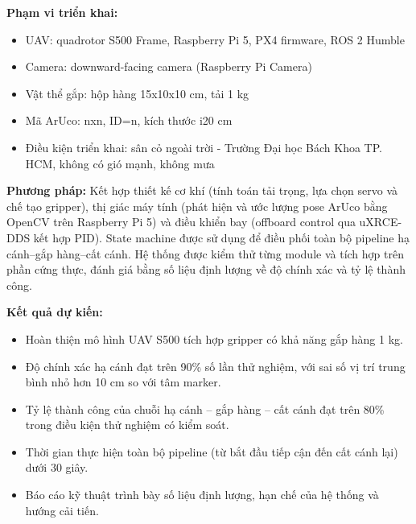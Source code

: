 \begin{mdframed}[style=decuongfield]
\vspace{1mm}
\textbf{Phạm vi triển khai:} 
\begin{itemize}
  \item UAV: quadrotor S500 Frame, Raspberry Pi 5, PX4 firmware, ROS 2 Humble
  \item Camera: downward-facing camera (Raspberry Pi Camera)
  \item Vật thể gắp: hộp hàng 15x10x10 cm, tải 1 kg
  \item Mã ArUco: nxn, ID=n, kích thước i20 cm
  \item Điều kiện triển khai: sân cỏ ngoài trời - Trường Đại học Bách Khoa TP. HCM, không có gió mạnh, không mưa
\end{itemize}
\par\vspace{-2mm}
\noindent\makebox[\linewidth][l]{\hspace*{-2.5mm}\rule{\dimexpr\linewidth+5mm\relax}{0.4pt}}\par


\vspace{1mm}
\textbf{Phương pháp:} 
Kết hợp thiết kế cơ khí (tính toán tải trọng, lựa chọn servo và chế tạo gripper), thị giác máy tính (phát hiện và ước lượng pose ArUco bằng OpenCV trên Raspberry Pi 5) và điều khiển bay (offboard control qua uXRCE-DDS kết hợp PID). State machine được sử dụng để điều phối toàn bộ pipeline hạ cánh–gắp hàng–cất cánh. Hệ thống được kiểm thử từng module và tích hợp trên phần cứng thực, đánh giá bằng số liệu định lượng về độ chính xác và tỷ lệ thành công.
\par\vspace{-2mm}
\noindent\makebox[\linewidth][l]{\hspace*{-2.5mm}\rule{\dimexpr\linewidth+5mm\relax}{0.4pt}}\par


\vspace{1mm}
\textbf{Kết quả dự kiến:} 
\begin{itemize}
\item Hoàn thiện mô hình UAV S500 tích hợp gripper có khả năng gắp hàng 1 kg.
\item Độ chính xác hạ cánh đạt trên 90\% số lần thử nghiệm, với sai số vị trí trung bình nhỏ hơn 10 cm so với tâm marker.
\item Tỷ lệ thành công của chuỗi hạ cánh – gắp hàng – cất cánh đạt trên 80\% trong điều kiện thử nghiệm có kiểm soát.
\item Thời gian thực hiện toàn bộ pipeline (từ bắt đầu tiếp cận đến cất cánh lại) dưới 30 giây.
\item Báo cáo kỹ thuật trình bày số liệu định lượng, hạn chế của hệ thống và hướng cải tiến.
\end{itemize}
\par\vspace{-2mm}
\noindent\makebox[\linewidth][l]{\hspace*{-2.5mm}\rule{\dimexpr\linewidth+5mm\relax}{0.4pt}}\par



\end{mdframed}
